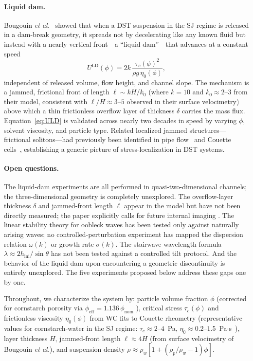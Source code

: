 \documentclass[aps,preprint,superscriptaddress,longbibliography]{revtex4-2}
\newcommand{\ULD}{{U^{\mathrm{LD}}}}
\newcommand{\tauc}{\tau_c}
\newcommand{\etaz}{\eta_0}
\begin{document}
\paragraph{Liquid dam.}
Bougouin \textit{et al.}~\cite{Bougouin2026PRL} showed that when a DST
suspension in the SJ regime is released in a dam-break geometry, it spreads
not by decelerating like any known fluid but instead with a nearly vertical
front---a ``liquid dam''---that advances at a constant speed
\begin{equation}
  \ULD(\phi) = 2k\,\frac{\tauc(\phi)^2}{\rho g\,\etaz(\phi)},
  \label{eq:ULD}
\end{equation}
independent of released volume, flow height, and channel slope.  The mechanism
is a jammed, frictional front of length $\ell \sim k H / k_0$ (where $k = 10$
and $k_0 \approx 2$--$3$ from their model, consistent with $\ell/H \approx 3$--$5$
observed in their surface velocimetry) above which a thin frictionless overflow
layer of thickness $\delta$ carries the mass flux.  Equation~\eqref{eq:ULD}
is validated across nearly two decades in speed by varying $\phi$, solvent
viscosity, and particle type.  Related localized jammed structures---frictional
solitons---had previously been identified in pipe flow~\cite{Bougouin2024PNAS}
and Couette cells~\cite{Rathee2022PNAS}, establishing a generic picture of
stress-localization in DST systems.

\paragraph{Open questions.}
The liquid-dam experiments are all performed in quasi-two-dimensional channels;
the three-dimensional geometry is completely unexplored.  The overflow-layer
thickness $\delta$ and jammed-front length $\ell$ appear in the model but have
not been directly measured; the paper explicitly calls for future internal imaging
\cite{Bougouin2026PRL}.  The linear stability theory for oobleck waves has been
tested only against naturally arising waves; no controlled-perturbation experiment
has mapped the dispersion relation $\omega(k)$ or growth rate $\sigma(k)$.  The
stairwave wavelength formula $\lambda \approx 2h_\text{ini}/\sin\theta$ has not
been tested against a controlled tilt protocol.  And the behavior of the liquid
dam upon encountering a geometric discontinuity is entirely unexplored.  The five
experiments proposed below address these gaps one by one.

Throughout, we characterize the system by: particle volume fraction $\phi$
(corrected for cornstarch porosity via $\phi_\text{eff} = 1.136\,\phi_\text{nom}$
\cite{HanVanHaJaeger2017}), critical stress $\tauc(\phi)$ and frictionless
viscosity $\etaz(\phi)$ from WC fits to Couette rheometry (representative values
for cornstarch-water in the SJ regime: $\tauc \approx 2$--$4$~Pa,
$\etaz \approx 0.2$--$1.5$~Pa$\cdot$s~\cite{Bougouin2026PRL}), layer thickness
$H$, jammed-front length $\ell \approx 4H$ (from surface velocimetry of
Bougouin \textit{et al.}), and suspension density
$\rho \approx \rho_w\left[1 + (\rho_p/\rho_w - 1)\phi\right]$.
\end{document}

